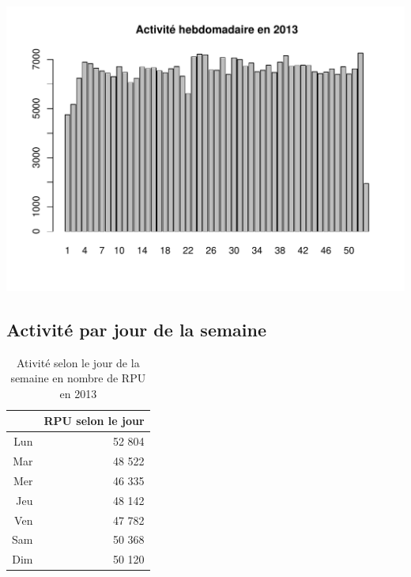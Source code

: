 \documentclass[12pt,english,french,twoside]{book}\usepackage[]{graphicx}\usepackage[]{color}
\makeatletter
\def\maxwidth{ %
  \ifdim\Gin@nat@width>\linewidth
    \linewidth
  \else
    \Gin@nat@width
  \fi
}
\newenvironment{knitrout}{}{} %
\makeatother
\begin{document}
\begin{center}
\begin{knitrout}
\color{fgcolor}
\includegraphics[width=\maxwidth]{figure/bp_act_sem-1} 

\end{knitrout}
\label{fig:act_sem}
\end{center}

\subsection*{Activité par jour de la semaine}

\begin{table}[ht]
\centering
\begin{tabular}{rr}
  \hline
 & RPU selon le jour \\ 
  \hline
Lun & 52 804 \\ 
  Mar & 48 522 \\ 
  Mer & 46 335 \\ 
  Jeu & 48 142 \\ 
  Ven & 47 782 \\ 
  Sam & 50 368 \\ 
  Dim & 50 120 \\ 
   \hline
\end{tabular}
\caption[RPU par jour de semaine]{Ativité selon le jour de la semaine en nombre de RPU en 2013} 
\end{table}
\end{document}
